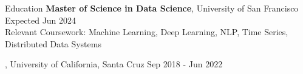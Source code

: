 \documentclass{resume} %
\begin{document}
\begin{rSection}{Education}
    {\bf Master of Science in Data Science}, University of San Francisco \hfill {Expected Jun 2024}
    \\Relevant Coursework: Machine Learning, Deep Learning,
    NLP, Time Series, Distributed Data Systems

    , University of California, Santa Cruz \hfill {Sep 2018 - Jun 2022}
\end{rSection}

\end{document}
